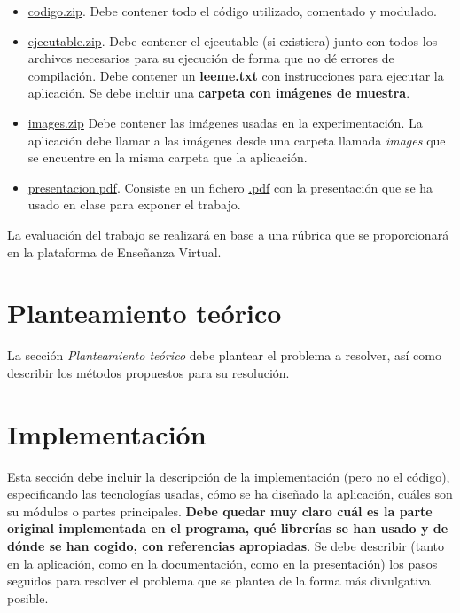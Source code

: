 \documentclass[a4paper]{article}
\begin{document}
\begin{itemize}
\item \url{codigo.zip}. Debe contener todo el código utilizado, comentado y modulado.
\item \url{ejecutable.zip}. Debe contener el ejecutable (si existiera) junto con todos los archivos necesarios para su ejecución de forma que no dé errores de compilación.
Debe contener un {\bf leeme.txt} con instrucciones para ejecutar la aplicación.
Se debe incluir una \textbf{carpeta con imágenes de muestra}.
\item \url{images.zip} Debe contener las imágenes usadas en la experimentación. La aplicación debe llamar a las imágenes desde una carpeta llamada \textit{images} que se encuentre en la misma carpeta que la aplicación.
\item \url{presentacion.pdf}. Consiste en un fichero \url{.pdf} con la presentación que se ha usado en clase para exponer el trabajo.
\end{itemize}

La evaluación del trabajo se realizará en base a una rúbrica que se proporcionará en la plataforma de Enseñanza Virtual.


\section{Planteamiento teórico}



La sección \textit{Planteamiento teórico} debe plantear el problema a resolver, así como describir los métodos propuestos para su resolución. 







\section{Implementación}

Esta sección debe incluir la descripción de la implementación (pero no el código), especificando las tecnologías usadas, cómo se ha diseñado la aplicación, cuáles son su módulos o partes principales. \textbf{Debe quedar muy claro cuál es la parte original implementada en el programa, qué librerías se han usado y de dónde se han cogido, con referencias apropiadas}. Se debe describir (tanto en la aplicación, como en la documentación, como en la presentación) los pasos seguidos para resolver el problema que se plantea de la forma más divulgativa posible. 
\end{document}
